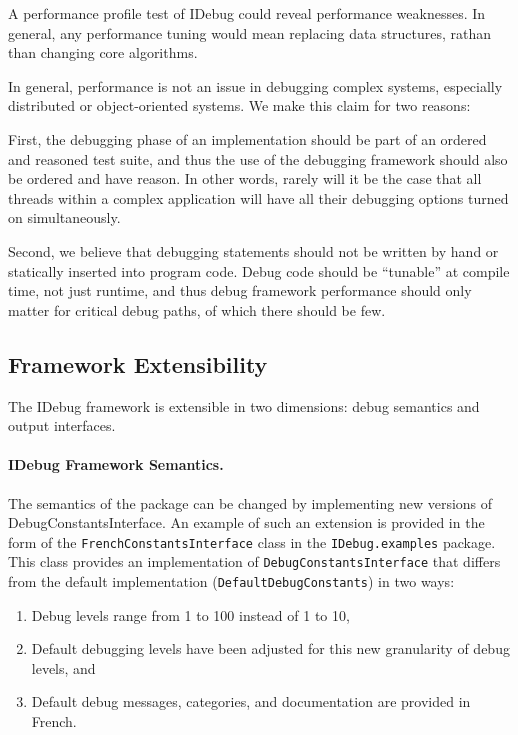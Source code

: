 \documentclass{article}
\begin{document}
A performance profile test of IDebug could reveal performance
weaknesses. In general, any performance tuning would mean replacing
data structures, rathan than changing core algorithms.

In general, performance is not an issue in debugging complex systems,
especially distributed or object-oriented systems.  We make this claim
for two reasons:

First, the debugging phase of an implementation should be part of an
ordered and reasoned test suite, and thus the use of the debugging
framework should also be ordered and have reason.  In other words,
rarely will it be the case that all threads within a complex
application will have all their debugging options turned on
simultaneously.  

Second, we believe that debugging statements should not be written by
hand or statically inserted into program code.  Debug code
should be ``tunable'' at compile time, not just runtime, and thus
debug framework performance should only matter for critical debug
paths, of which there should be few.  

\subsection{Framework Extensibility}

The IDebug framework is extensible in two dimensions: debug semantics
and output interfaces.  

\paragraph{IDebug Framework Semantics.}
The semantics of the package can be changed by implementing new
versions of DebugConstantsInterface.  An example of such an extension
is provided in the form of the
\texttt{FrenchConstantsInterface} class in the
\texttt{IDebug.examples} package.  This class
provides an implementation of \texttt{DebugConstantsInterface} that
differs from the default implementation (\texttt{DefaultDebugConstants})
in two ways:
\begin{enumerate}
\item Debug levels range from 1 to 100 instead of 1 to 10, 
\item Default debugging levels have been adjusted for this new
  granularity of debug levels, and
\item Default debug messages, categories, and documentation are
  provided in French.
\end{enumerate}
\end{document}
